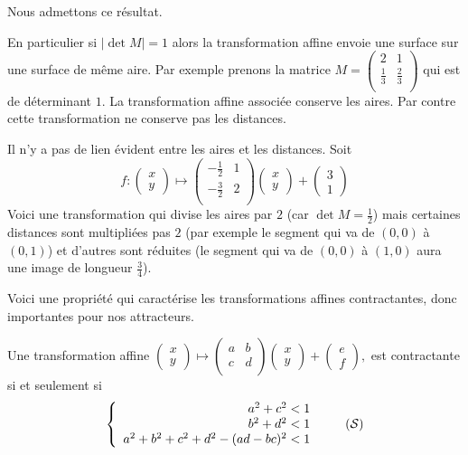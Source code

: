 \documentclass[11pt,class=report,crop=false]{standalone}
\newcommand{\myvec}[2]{\begin{pmatrix}#1 \\ #2\end{pmatrix}}
\newcommand{\commentfigure}[1]{#1} %
\begin{document}
Nous admettons ce résultat.



\begin{remarque*}
En particulier si $|\det M| = 1$ alors la transformation affine envoie une 
surface sur une surface de même aire.
Par exemple prenons la matrice $M = \begin{pmatrix} 2 & 1 \\ \frac 13 & \frac 23 \\ \end{pmatrix}$
qui est de déterminant $1$.
La transformation affine associée conserve les aires.
Par contre cette transformation ne conserve pas les distances.


Il n'y a pas de lien évident entre les aires et les distances. Soit
$$f : \myvec{x}{y} \mapsto  \begin{pmatrix} -\frac 12 & 1 \\ -\frac 32 & 2 \\ \end{pmatrix}\myvec{x}{y}
+\myvec{3}{1}$$
Voici une transformation qui divise les aires par $2$ (car $\det M = \frac 12$)
mais certaines distances sont multipliées pas $2$ (par exemple le segment qui va de $(0,0)$ à $(0,1)$)
et d'autres sont réduites (le segment qui va de $(0,0)$ à $(1,0)$ aura une image
de longueur $\frac 34$).

\end{remarque*}

 
Voici une propriété qui caractérise les transformations affines contractantes,
donc importantes pour nos attracteurs.

\begin{proposition}
Une transformation affine 
$\myvec{x}{y} \mapsto \begin{pmatrix}a & b \\ c & d \\  \end{pmatrix}
\myvec{x}{y} + \myvec{e}{f},$
est contractante si et seulement si
\begin{equation}
\left \{
\begin{array}{r}
    a^2 + c^2 < 1 \\
    b^2 + d^2 < 1 \\
    a^2+b^2+c^2+d^2 - (ad-bc)^2 < 1 \\
\end{array}
\right.
\label{eq:syscontrac}\tag{$\mathcal{S}$}
\end{equation}
\end{proposition}
\end{document}
